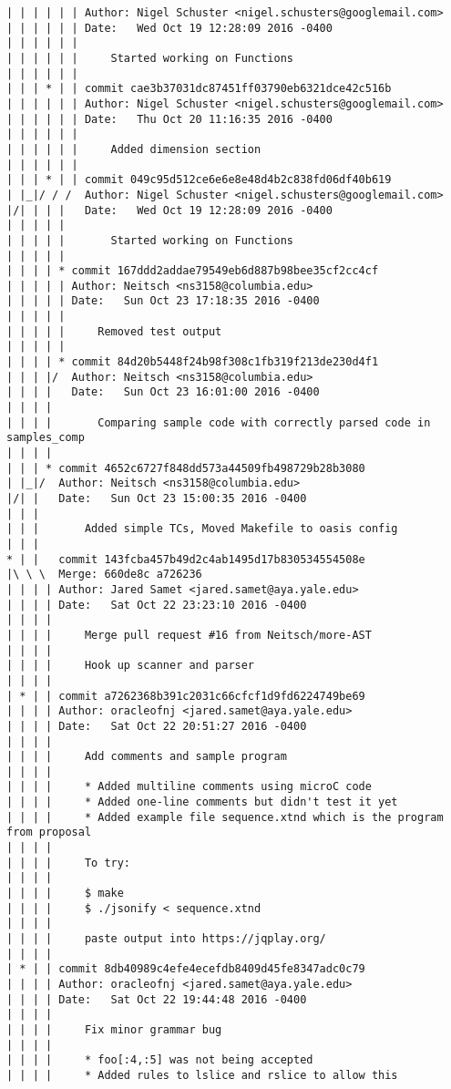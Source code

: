 \begin{lstlisting}
| | | | | | Author: Nigel Schuster <nigel.schusters@googlemail.com>
| | | | | | Date:   Wed Oct 19 12:28:09 2016 -0400
| | | | | | 
| | | | | |     Started working on Functions
| | | | | |       
| | | * | | commit cae3b37031dc87451ff03790eb6321dce42c516b
| | | | | | Author: Nigel Schuster <nigel.schusters@googlemail.com>
| | | | | | Date:   Thu Oct 20 11:16:35 2016 -0400
| | | | | | 
| | | | | |     Added dimension section
| | | | | |       
| | | * | | commit 049c95d512ce6e6e8e48d4b2c838fd06df40b619
| |_|/ / /  Author: Nigel Schuster <nigel.schusters@googlemail.com>
|/| | | |   Date:   Wed Oct 19 12:28:09 2016 -0400
| | | | |   
| | | | |       Started working on Functions
| | | | |      
| | | | * commit 167ddd2addae79549eb6d887b98bee35cf2cc4cf
| | | | | Author: Neitsch <ns3158@columbia.edu>
| | | | | Date:   Sun Oct 23 17:18:35 2016 -0400
| | | | | 
| | | | |     Removed test output
| | | | |      
| | | | * commit 84d20b5448f24b98f308c1fb319f213de230d4f1
| | | |/  Author: Neitsch <ns3158@columbia.edu>
| | | |   Date:   Sun Oct 23 16:01:00 2016 -0400
| | | |   
| | | |       Comparing sample code with correctly parsed code in samples_comp
| | | |     
| | | * commit 4652c6727f848dd573a44509fb498729b28b3080
| |_|/  Author: Neitsch <ns3158@columbia.edu>
|/| |   Date:   Sun Oct 23 15:00:35 2016 -0400
| | |   
| | |       Added simple TCs, Moved Makefile to oasis config
| | |      
* | |   commit 143fcba457b49d2c4ab1495d17b830534554508e
|\ \ \  Merge: 660de8c a726236
| | | | Author: Jared Samet <jared.samet@aya.yale.edu>
| | | | Date:   Sat Oct 22 23:23:10 2016 -0400
| | | | 
| | | |     Merge pull request #16 from Neitsch/more-AST
| | | |     
| | | |     Hook up scanner and parser
| | | |     
| * | | commit a7262368b391c2031c66cfcf1d9fd6224749be69
| | | | Author: oracleofnj <jared.samet@aya.yale.edu>
| | | | Date:   Sat Oct 22 20:51:27 2016 -0400
| | | | 
| | | |     Add comments and sample program
| | | |     
| | | |     * Added multiline comments using microC code
| | | |     * Added one-line comments but didn't test it yet
| | | |     * Added example file sequence.xtnd which is the program from proposal
| | | |     
| | | |     To try:
| | | |     
| | | |     $ make
| | | |     $ ./jsonify < sequence.xtnd
| | | |     
| | | |     paste output into https://jqplay.org/
| | | |     
| * | | commit 8db40989c4efe4ecefdb8409d45fe8347adc0c79
| | | | Author: oracleofnj <jared.samet@aya.yale.edu>
| | | | Date:   Sat Oct 22 19:44:48 2016 -0400
| | | | 
| | | |     Fix minor grammar bug
| | | |     
| | | |     * foo[:4,:5] was not being accepted
| | | |     * Added rules to lslice and rslice to allow this

\end{lstlisting}
